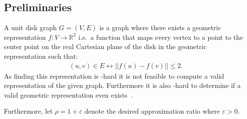 \subsection{Preliminaries}
A unit disk graph $G=(V,E)$ is a graph where there exists a geometric representation $f:V \to \mathbb R^2$ i.e.\ a function that maps every vertex to a point to the center point on the real Cartesian plane of the disk in the geometric representation such that:
\begin{align}
(u,v) \in E \leftrightarrow ||f(u) - f(v)|| \leq 2.\label{eq:maxdist}
\end{align}
As finding this representation is \NP-hard it is not feasible to compute a valid representation of the given graph. Furthermore it is also \NP-hard to determine if a valid geometric representation even exists~\cite{nphard}.

Furthermore, let $\rho = 1+\varepsilon$ denote the desired approximation ratio where $\varepsilon > 0$. 
